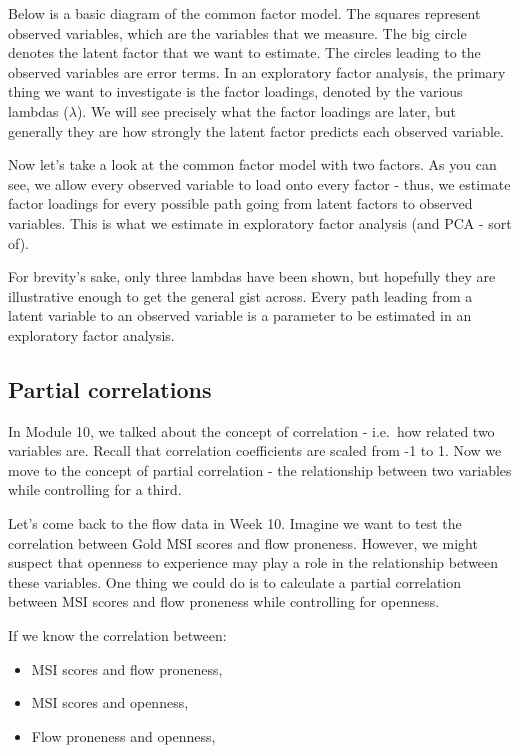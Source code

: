 \documentclass[
]{book}
\providecommand{\tightlist}{%
  \setlength{\itemsep}{0pt}\setlength{\parskip}{0pt}}
\begin{document}
Below is a basic diagram of the common factor model. The squares represent observed variables, which are the variables that we measure. The big circle denotes the latent factor that we want to estimate. The circles leading to the observed variables are error terms. In an exploratory factor analysis, the primary thing we want to investigate is the factor loadings, denoted by the various lambdas (\(\lambda\)). We will see precisely what the factor loadings are later, but generally they are how strongly the latent factor predicts each observed variable.



Now let's take a look at the common factor model with two factors. As you can see, we allow every observed variable to load onto every factor - thus, we estimate factor loadings for every possible path going from latent factors to observed variables. This is what we estimate in exploratory factor analysis (and PCA - sort of).

For brevity's sake, only three lambdas have been shown, but hopefully they are illustrative enough to get the general gist across. Every path leading from a latent variable to an observed variable is a parameter to be estimated in an exploratory factor analysis.



\hypertarget{partial-correlations}{%
\subsection{Partial correlations}\label{partial-correlations}}

In Module 10, we talked about the concept of correlation - i.e.~how related two variables are. Recall that correlation coefficients are scaled from -1 to 1. Now we move to the concept of partial correlation - the relationship between two variables while controlling for a third.

Let's come back to the flow data in Week 10. Imagine we want to test the correlation between Gold MSI scores and flow proneness. However, we might suspect that openness to experience may play a role in the relationship between these variables. One thing we could do is to calculate a partial correlation between MSI scores and flow proneness while controlling for openness.

If we know the correlation between:

\begin{itemize}
\tightlist
\item
  MSI scores and flow proneness,
\item
  MSI scores and openness,
\item
  Flow proneness and openness,
\end{itemize}
\end{document}
